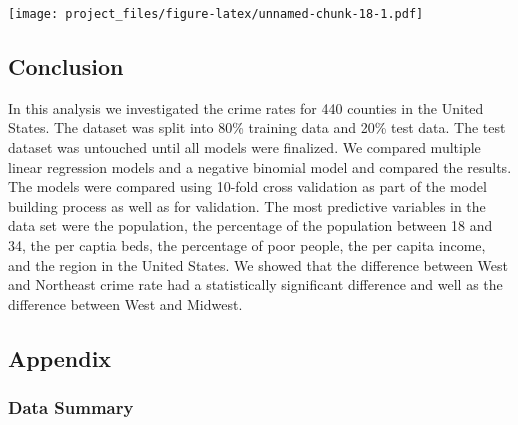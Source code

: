 \documentclass[]{article}
\begin{document}
\texttt{[image: project\_files/figure-latex/unnamed-chunk-18-1.pdf]}

\subsection{Conclusion}\label{conclusion}

In this analysis we investigated the crime rates for 440 counties in the
United States. The dataset was split into 80\% training data and 20\%
test data. The test dataset was untouched until all models were
finalized. We compared multiple linear regression models and a negative
binomial model and compared the results. The models were compared using
10-fold cross validation as part of the model building process as well
as for validation. The most predictive variables in the data set were
the population, the percentage of the population between 18 and 34, the
per captia beds, the percentage of poor people, the per capita income,
and the region in the United States. We showed that the difference
between West and Northeast crime rate had a statistically significant
difference and well as the difference between West and Midwest.

\subsection{Appendix}\label{appendix}

\subsubsection{Data Summary}\label{data-summary}
\end{document}
